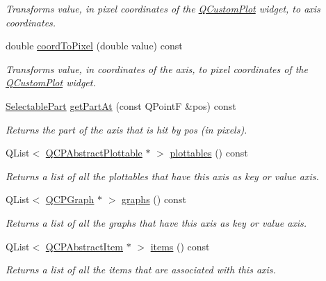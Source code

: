 \begin{DoxyCompactItemize}
\begin{DoxyCompactList}\small\item\em Transforms {\itshape value}, in pixel coordinates of the \hyperlink{classQCustomPlot}{Q\+Custom\+Plot} widget, to axis coordinates. \end{DoxyCompactList}\item 
\hypertarget{classQCPAxis_a985ae693b842fb0422b4390fe36d299a}{}double \hyperlink{classQCPAxis_a985ae693b842fb0422b4390fe36d299a}{coord\+To\+Pixel} (double value) const \label{classQCPAxis_a985ae693b842fb0422b4390fe36d299a}

\begin{DoxyCompactList}\small\item\em Transforms {\itshape value}, in coordinates of the axis, to pixel coordinates of the \hyperlink{classQCustomPlot}{Q\+Custom\+Plot} widget. \end{DoxyCompactList}\item 
\hyperlink{classQCPAxis_abee4c7a54c468b1385dfce2c898b115f}{Selectable\+Part} \hyperlink{classQCPAxis_ab2965a8ab1da948b897f1c006080760b}{get\+Part\+At} (const Q\+Point\+F \&pos) const 
\begin{DoxyCompactList}\small\item\em Returns the part of the axis that is hit by {\itshape pos} (in pixels). \end{DoxyCompactList}\item 
Q\+List$<$ \hyperlink{classQCPAbstractPlottable}{Q\+C\+P\+Abstract\+Plottable} $\ast$ $>$ \hyperlink{classQCPAxis_a4f7404494cccdbfc00e1e865b7ed16a4}{plottables} () const 
\begin{DoxyCompactList}\small\item\em Returns a list of all the plottables that have this axis as key or value axis. \end{DoxyCompactList}\item 
Q\+List$<$ \hyperlink{classQCPGraph}{Q\+C\+P\+Graph} $\ast$ $>$ \hyperlink{classQCPAxis_ad3919e7d7400f55446ea82018fe5e3a8}{graphs} () const 
\begin{DoxyCompactList}\small\item\em Returns a list of all the graphs that have this axis as key or value axis. \end{DoxyCompactList}\item 
Q\+List$<$ \hyperlink{classQCPAbstractItem}{Q\+C\+P\+Abstract\+Item} $\ast$ $>$ \hyperlink{classQCPAxis_ae437656a5fd1a03721a8f2d7aab460fe}{items} () const 
\begin{DoxyCompactList}\small\item\em Returns a list of all the items that are associated with this axis. \end{DoxyCompactList}\end{DoxyCompactItemize}

